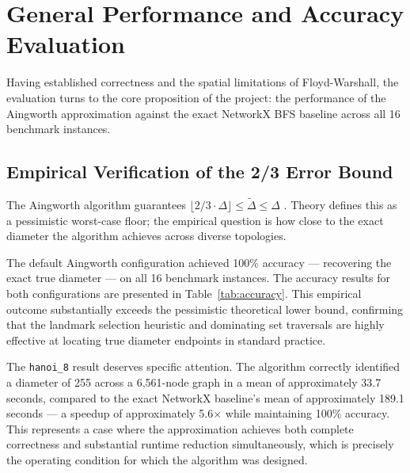 \section{General Performance and Accuracy Evaluation}

Having established correctness and the spatial limitations of Floyd-Warshall, the evaluation turns to the core proposition of the project: the performance of the Aingworth approximation \cite{aingworth96} against the exact NetworkX BFS baseline across all 16 benchmark instances.

\subsection{Empirical Verification of the 2/3 Error Bound}

The Aingworth algorithm guarantees $\lfloor 2/3 \cdot \Delta \rfloor \le \tilde{\Delta} \le \Delta$ \cite{aingworth96}. Theory defines this as a pessimistic worst-case floor; the empirical question is how close to the exact diameter the algorithm achieves across diverse topologies.

The default Aingworth configuration achieved 100\% accuracy --- recovering the exact true diameter --- on all 16 benchmark instances. The accuracy results for both configurations are presented in Table~\ref{tab:accuracy}. This empirical outcome substantially exceeds the pessimistic theoretical lower bound, confirming that the landmark selection heuristic and dominating set traversals are highly effective at locating true diameter endpoints in standard practice.

The \texttt{hanoi\_8} result deserves specific attention. The algorithm correctly identified a diameter of 255 across a 6,561-node graph in a mean of approximately 33.7 seconds, compared to the exact NetworkX baseline's mean of approximately 189.1 seconds --- a speedup of approximately 5.6$\times$ while maintaining 100\% accuracy. This represents a case where the approximation achieves both complete correctness and substantial runtime reduction simultaneously, which is precisely the operating condition for which the algorithm was designed.

